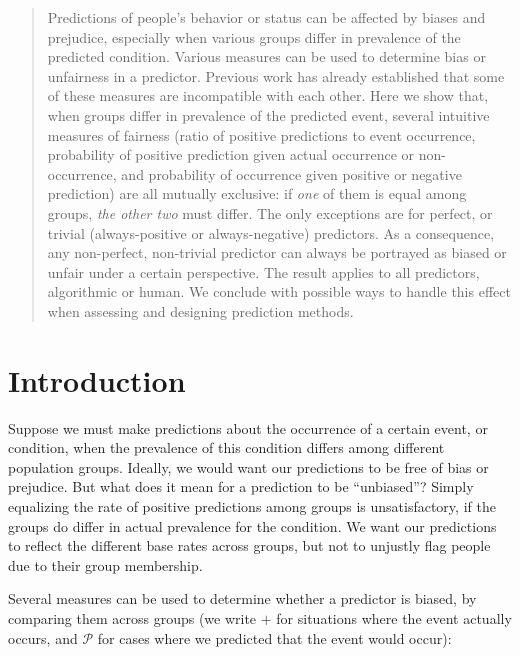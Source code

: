 \documentclass[twocolumn]{article}
\begin{document}
\begin{abstract}

Predictions of people's behavior or status can be affected by biases and
prejudice, especially when various groups differ in prevalence of the predicted
condition. Various measures can be used to determine bias or unfairness in a
predictor. Previous work has already established that some of these measures
are incompatible with each other. Here we show that, when groups differ in prevalence
of the predicted event, several intuitive measures of fairness (ratio of
positive predictions to event occurrence, probability of positive prediction
given actual occurrence or non-occurrence, and probability of occurrence given
positive or negative prediction) are all mutually exclusive: if \emph{one} of
them is equal among groups, \emph{the other two} must differ. The only
exceptions are for perfect, or trivial (always-positive or always-negative)
predictors. As a consequence, any non-perfect, non-trivial predictor can always
be portrayed as biased or unfair under a certain perspective. The result
applies to all predictors, algorithmic or human. We conclude with possible ways
to handle this effect when assessing and designing prediction methods.


\end{abstract}

\section{Introduction}

Suppose we must make predictions about the occurrence of a certain event, or
condition, when the prevalence of this condition differs among different
population groups. Ideally, we would want our predictions to be free of bias or
prejudice. But what does it mean for a prediction to be ``unbiased''? Simply
equalizing the rate of positive predictions among groups is unsatisfactory, if
the groups do differ in actual prevalence for the condition. We want our
predictions to reflect the different base rates across groups, but not to
unjustly flag people due to their group membership.


Several measures can be used to determine whether a predictor is biased, by
comparing them across groups (we write $+$ for situations where the event actually occurs, and $\mathcal{P}$ for cases where we predicted that the event would occur):
\end{document}
